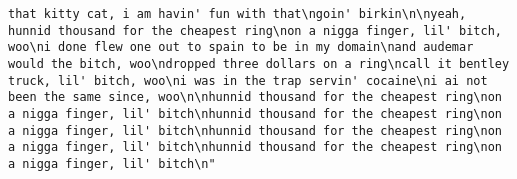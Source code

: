 \documentclass[]{article}
\begin{document}
\begin{verbatim}
that kitty cat, i am havin' fun with that\ngoin' birkin\n\nyeah, hunnid thousand for the cheapest ring\non a nigga finger, lil' bitch, woo\ni done flew one out to spain to be in my domain\nand audemar would the bitch, woo\ndropped three dollars on a ring\ncall it bentley truck, lil' bitch, woo\ni was in the trap servin' cocaine\ni ai not been the same since, woo\n\nhunnid thousand for the cheapest ring\non a nigga finger, lil' bitch\nhunnid thousand for the cheapest ring\non a nigga finger, lil' bitch\nhunnid thousand for the cheapest ring\non a nigga finger, lil' bitch\nhunnid thousand for the cheapest ring\non a nigga finger, lil' bitch\n"                                                                                                                                                                                                                                                                                                                                                                                                                                                                                                                                                                                                                                                                                                                                                                                                                                                                                                                                                                                                                                                                                                                                                                                                                                                                                                                                                                                                                                                                                                                                                                                                                                                                                                                                                                                                                                                                                                                                                                                                                                                                                                                                                                                                                                                                                                                        

\end{verbatim}
\end{document}
